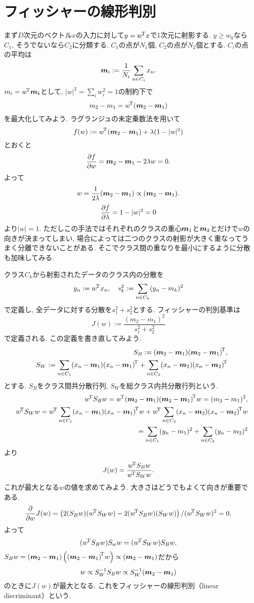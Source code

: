 \section{フィッシャーの線形判別}
まず$D$次元のベクトル$x$の入力に対して$y=\trans{w}x$で1次元に射影する.
$y \ge w_0$なら$C_1$, そうでないなら$C_2$に分類する.
$C_1$の点が$N_1$個, $C_2$の点が$N_2$個とする.
$C_i$の点の平均は
$$
\bmm_i:=\frac{1}{N_i}\sum_{n \in C_i} x_n.
$$
$m_i=\trans{w}\bm{m_i}$として, $|w|^2=\sum_i w_i^2=1$の制約下で
$$
m_2 - m_1=\trans{w}(\bmm_2-\bmm_1)
$$
を最大化してみよう.
ラグランジュの未定乗数法を用いて
$$
f(w):=\trans{w}(\bmm_2-\bmm_1)+\lambda(1-|w|^2)
$$
とおくと
$$
\diff{w}{f}=\bmm_2-\bmm_1-2\lambda w = 0.
$$
よって
$$
w=\frac{1}{2\lambda}(\bmm_2-\bmm_1) \propto (\bmm_2-\bmm_1).
$$
$$
\diff{\lambda}{f}=1-|w|^2=0
$$
より$|w|=1$.
ただしこの手法ではそれぞれのクラスの重心$\bmm_1$と$\bmm_2$とだけで$w$の向きが決まってしまい,
場合によっては二つのクラスの射影が大きく重なってうまく分離できないことがある.
そこでクラス間の重なりを最小にするように分散も加味してみる.

クラス$C_k$から射影されたデータのクラス内の分散を
$$
y_n:=\trans{w}x_n, \quad s_k^2:=\sum_{n\in C_k}(y_n-m_k)^2
$$
で定義し, 全データに対する分散を$s_1^2+s_2^2$とする.
フィッシャーの判別基準は
$$
J(w):=\frac{(m_2-m_1)^2}{s_1^2+s_2^2}
$$
で定義される. この定義を書き直してみよう.
\begin{eqnarray*}&&
S_B:=(\bmm_2-\bmm_1)\trans{(\bmm_2-\bmm_1)},
\\&&
S_W:=\sum_{n \in C_1}(x_n-\bmm_1)\trans{(x_n-\bmm_1)}+\sum_{n \in C_2}(x_n-\bmm_2)\trans{(x_n-\bmm_2)}
\end{eqnarray*}
とする.
$S_B$をクラス間共分散行列, $S_W$を総クラス内共分散行列という.
\begin{eqnarray*}&&
\trans{w}S_B w
 = \trans{w}(\bmm_2-\bmm_1)\trans{(\bmm_2-\bmm_1)}w
 = (m_2-m_1)^2,
\\&&
\trans{w}S_W w
 = \trans{w}\sum_{n \in C_1}(x_n-\bmm_1)\trans{(x_n-\bmm_1)}w+\trans{w}\sum_{n \in C_2}(x_n-\bmm_2)\trans{(x_n-\bmm_2)}w
\\&&\phantom{\trans{w}S_W w }
 = \sum_{n\in C_1} (y_n-m_1)^2+\sum_{n\in C_2}(y_n-m_2)^2
\end{eqnarray*}
より
$$
J(w)=\frac{\trans{w}S_B w}{\trans{w} S_W w}.
$$
これが最大となる$w$の値を求めてみよう.
大きさはどうでもよくて向きが重要である.
$$
\dif{w}J(w)=\left(2 (S_B w)(\trans{w} S_W w) - 2 (\trans{w} S_B w) (S_W w)\right)/(\trans{w}S_W w)^2=0.
$$
よって
$$
(\trans{w}S_B w)S_w w = (\trans{w} S_W w)S_B w.
$$
$S_B w = (\bmm_2-\bmm_1)\left(\trans{(\bmm_2-\bmm_1)}w\right)\propto (\bmm_2-\bmm_1)$だから
$$
w \propto S_W^{-1}S_B w \propto S_W^{-1}(\bmm_2-\bmm_1)
$$
のときに$J(w)$が最大となる. これをフィッシャーの線形判別（linear discriminant）という.

